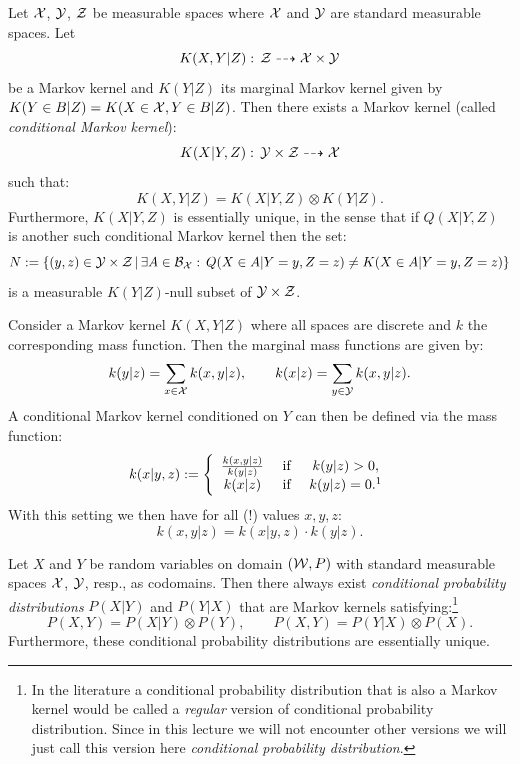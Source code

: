 \begin{DefThm}
    \label{thm-regular-conditional-Markov-kernel}
    Let $\mathcal{X}$, $\mathcal{Y}$, $\mathcal{Z}$ be measurable spaces where $\mathcal{X}$ and $\mathcal{Y}$ are standard measurable spaces.
    Let 
    \[ K(X,Y|Z):\, \mathcal{Z} \dashrightarrow \mathcal{X} \times \mathcal{Y}\]
    be a Markov kernel and $K(Y|Z)$ its marginal Markov kernel given by $K(Y\in B|Z) = K(X \in \mathcal{X}, Y \in B|Z)$.
    Then there exists a Markov kernel (called \emph{conditional Markov kernel}):
    \[ K(X|Y,Z):\, \mathcal{Y} \times \mathcal{Z} \dashrightarrow \mathcal{X}\]
    such that:
    \[   K(X,Y|Z) = K(X|Y,Z) \otimes K(Y|Z).\]
    Furthermore, $K(X|Y,Z)$ is essentially unique, in the sense that
    if $Q(X|Y,Z)$ is another such conditional Markov kernel
    then the set:
    \[ N:= \left \{ (y,z) \in \mathcal{Y} \times \mathcal{Z} \,|\, \exists A \in \mathcal{B}_{\mathcal{X}}:\, Q(X \in A|Y=y,Z=z) \neq K(X \in A|Y=y,Z=z)\right \}  \]
    is a measurable $K(Y|Z)$-null subset of $\mathcal{Y} \times \mathcal{Z}$.
\end{DefThm}

\begin{Eg}
    Consider a Markov kernel $K(X,Y|Z)$ where all spaces are discrete and $k$ the corresponding mass function.
    Then the marginal mass functions are given by:
    \[ k(y|z) = \sum_{x \in \mathcal{X}} k(x,y|z), \qquad k(x|z) = \sum_{y \in \mathcal{Y}} k(x,y|z). \]
    A conditional Markov kernel conditioned on $Y$ can then be defined via the mass function:
    \[
        k(x|y,z) := \left\{
            \begin{array}{cccc}
                \frac{k(x,y|z)}{k(y|z)} & \text{ if } & k(y|z) >0,\\
                k(x|z)& \text{ if } & k(y|z) = 0.\footnotemark
            \end{array}\right.
    \]
    With this setting we then have for all (!) values $x,y,z$:
    \[ k(x,y|z) = k(x|y,z) \cdot k(y|z). \]
\end{Eg}

\begin{Cor}
    Let $X$ and $Y$ be random variables on domain $(\mathcal{W},P)$ with standard measurable spaces $\mathcal{X}$, $\mathcal{Y}$, resp., as codomains.
    Then there always exist \emph{conditional probability distributions} $P(X|Y)$ and $P(Y|X)$ that are Markov kernels satisfying:\footnote{In the literature a conditional probability distribution that is also a Markov kernel would be called a \emph{regular} version of conditional probability distribution. Since in this lecture we will not encounter other versions we will just call this version here \emph{conditional probability distribution}.}
    \[ P(X,Y) = P(X|Y) \otimes P(Y),\qquad P(X,Y) = P(Y|X) \otimes P(X).  \]
    Furthermore, these conditional probability distributions are essentially unique.
\end{Cor}


